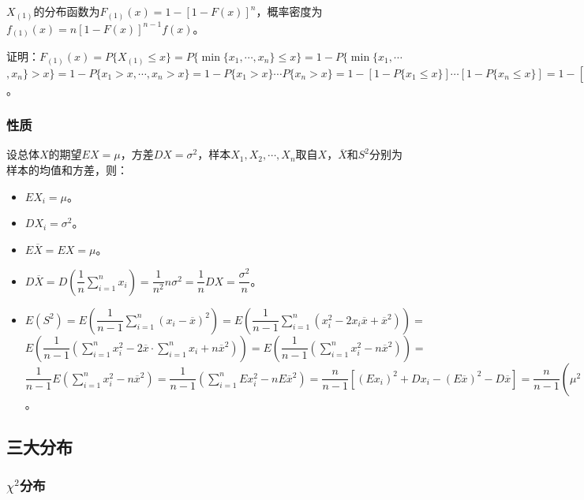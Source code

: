 \documentclass[UTF8, 12pt]{ctexart}
\begin{document}
$X_{(1)}$的分布函数为$F_{(1)}(x)=1-[1-F(x)]^n$，概率密度为$f_{(1)}(x)=n[1-F(x)]^{n-1}f(x)$。

证明：$F_{(1)}(x)=P\{X_{(1)}\leqslant x\}=P\{\min\{x_1,\cdots,x_n\}\leqslant x\}=1-P\{\min\{x_1,\cdots$\\$,x_n\}>x\}=1-P\{x_1>x,\cdots,x_n>x\}=1-P\{x_1>x\}\cdots P\{x_n>x\}=1-[1-P\{x_1\leqslant x\}]\cdots[1-P\{x_n\leqslant x\}]=1-[1-F_{(1)}(x)]\cdots[1-F_{(n)}(x)]=1-[1-F(x)]^n$。

\subsubsection{性质}

设总体$X$的期望$EX=\mu$，方差$DX=\sigma^2$，样本$X_1,X_2,\cdots,X_n$取自$X$，$\overline{X}$和$S^2$分别为样本的均值和方差，则：

\begin{itemize}
    \item $EX_i=\mu$。
    \item $DX_i=\sigma^2$。
    \item $E\overline{X}=EX=\mu$。
    \item $D\overline{X}=D\left(\dfrac{1}{n}\sum\limits_{i=1}^nx_i\right)=\dfrac{1}{n^2}n\sigma^2=\dfrac{1}{n}DX=\dfrac{\sigma^2}{n}$。
    \item $E(S^2)=E\left(\dfrac{1}{n-1}\sum\limits_{i=1}^n(x_i-\overline{x})^2\right)=E\left(\dfrac{1}{n-1}\sum\limits_{i=1}^n(x_i^2-2x_i\overline{x}+\overline{x}^2)\right)=$\\$E\left(\dfrac{1}{n-1}\left(\sum\limits_{i=1}^nx_i^2-2\overline{x}\cdot\sum\limits_{i=1}^nx_i+n\overline{x}^2\right)\right)=E\left(\dfrac{1}{n-1}\left(\sum\limits_{i=1}^nx_i^2-n\overline{x}^2\right)\right)=$\\$\dfrac{1}{n-1}E\left(\sum\limits_{i=1}^nx_i^2-n\overline{x}^2\right)=\dfrac{1}{n-1}\left(\sum\limits_{i=1}^nEx_i^2-nE\overline{x}^2\right)=\dfrac{n}{n-1}[(Ex_i)^2+Dx_i-(E\overline{x})^2-D\overline{x}]=\dfrac{n}{n-1}\left(\mu^2+\sigma^2-\mu^2-\dfrac{\sigma^2}{n}\right)=DX=\sigma^2$。
\end{itemize}

\subsection{三大分布}

\subsubsection{\texorpdfstring{$\chi^2$分布}{}}
\end{document}
